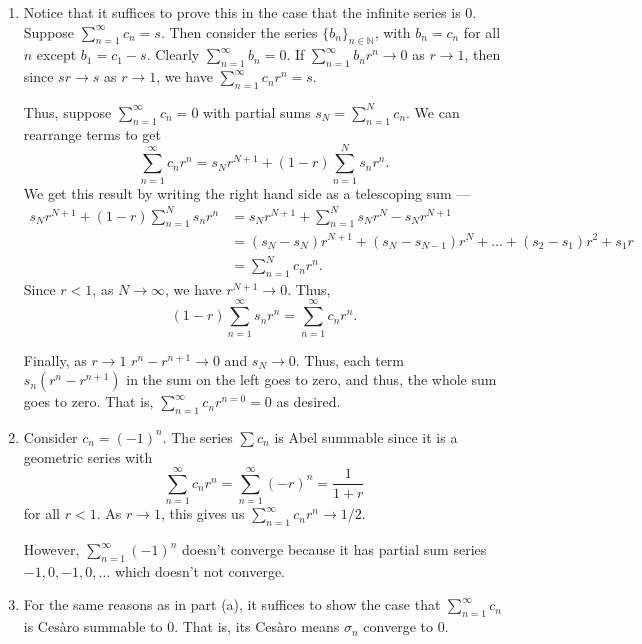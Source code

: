 \documentclass[12 pt, letterpaper]{hmcpset}
\begin{document}
\begin{solution}
	\begin{enumerate}
		\item Notice that it suffices to prove this in the case that the infinite series is $0$. Suppose $\sum_{n = 1}^{\infty} c_{n} = s$. Then consider the series $\{ b_{n} \}_{n \in \mathbb{N}}$, with $b_{n} = c_{n}$ for all $n$ except $b_{1} = c_{1} - s$. Clearly $\sum_{n = 1}^{\infty} b_{n} = 0$. If $\sum_{n = 1}^{\infty} b_{n} r^{n} \to 0$ as $r \to 1$, then since $s r \to s$ as $r \to 1$, we have $\sum_{n = 1}^{\infty} c_{n} r^{n} = s$.

			Thus, suppose $\sum_{n = 1}^{\infty} c_{n} = 0$ with partial sums $s_{N} = \sum_{n = 1}^{N} c_{n}$. We can rearrange terms to get
			\[
				\sum_{n = 1}^{\infty} c_{n} r^{n} = s_{N} r^{N + 1} + (1 - r) \sum_{n = 1}^{N} s_{n} r^{n}.
			\]
			We get this result by writing the right hand side as a telescoping sum ---
			\begin{align*}
				s_{N} r^{N + 1} + (1 - r) \sum_{n = 1}^{N} s_{n} r^{n} & = s_{N} r^{N + 1} + \sum_{n = 1}^{N} s_{N} r^{N} - s_{N} r^{N + 1} \\
										       & = (s_{N} - s_{N}) r^{N + 1} + (s_{N} - s_{N - 1}) r^{N} + \dots + (s_{2} - s_{1}) r^{2} + s_{1} r \\
										       & = \sum_{n = 1}^{N} c_{n} r^{n}.
			\end{align*}
			Since $r < 1$, as $N \to \infty$, we have $r^{N + 1} \to 0$. Thus,
			\[
				(1 - r) \sum_{n = 1}^{\infty} s_{n} r^{n} = \sum_{n = 1}^{\infty} c_{n} r^{n}.
			\]

			Finally, as $r \to 1$ $r^{n} - r^{n + 1} \to 0$ and $s_{N} \to 0$. Thus, each term $s_{n} (r^{n} - r^{n + 1})$ in the sum on the left goes to zero, and thus, the whole sum goes to zero. That is, $\sum_{n = 1}^{\infty} c_{n} r^{n = 0} = 0$ as desired.

		\item Consider $c_{n} = (-1)^{n}$. The series $\sum c_{n}$ is Abel summable since it is a geometric series with
			\[
				\sum_{n = 1}^{\infty} c_{n} r^{n} = \sum_{n = 1}^{\infty} (-r)^{n} = \frac{1}{1 + r}
			\]
			for all $r < 1$. As $r \to 1$, this gives us $\sum_{n = 1}^{\infty} c_{n} r^{n} \to 1 / 2$.

			However, $\sum_{n = 1}^{\infty} (-1)^{n}$ doesn't converge because it has partial sum series $-1, 0, -1, 0, \dots$ which doesn't not converge.

		\item For the same reasons as in part (a), it suffices to show the case that $\sum_{n = 1}^{\infty} c_{n}$ is Ces\`aro summable to $0$. That is, its Ces\`aro means $\sigma_{n}$ converge to $0$.


\end{enumerate}
\end{solution}
\end{document}
